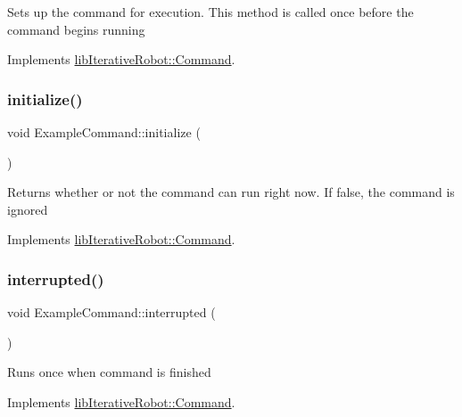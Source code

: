 Sets up the command for execution. This method is called once before the command begins running 

Implements \mbox{\hyperlink{classlib_iterative_robot_1_1_command_a4b38164af1a8645fae2fdae296317cf4}{lib\+Iterative\+Robot\+::\+Command}}.

\mbox{\label{class_example_command_ae7bea17127c1697acbf90d6022eb5b5d}} 
\subsubsection{\texorpdfstring{initialize()}{initialize()}}
{\footnotesize\ttfamily void Example\+Command\+::initialize (\begin{DoxyParamCaption}{ }\end{DoxyParamCaption})\hspace{0.3cm}{\ttfamily [virtual]}}

Returns whether or not the command can run right now. If false, the command is ignored 

Implements \mbox{\hyperlink{classlib_iterative_robot_1_1_command_a14543c9d38b07e52f9ffb2af88a63f60}{lib\+Iterative\+Robot\+::\+Command}}.

\mbox{\label{class_example_command_ae5a4bb67aa6e6c6234c3dca8eb7ad7ec}} 
\subsubsection{\texorpdfstring{interrupted()}{interrupted()}}
{\footnotesize\ttfamily void Example\+Command\+::interrupted (\begin{DoxyParamCaption}{ }\end{DoxyParamCaption})\hspace{0.3cm}{\ttfamily [virtual]}}

Runs once when command is finished 

Implements \mbox{\hyperlink{classlib_iterative_robot_1_1_command_a1c17b601d1b69822cabadb92069d1747}{lib\+Iterative\+Robot\+::\+Command}}.

\mbox{\label{class_example_command_ab4e52d526bda7fe22705b2d3c44286e0}} 
